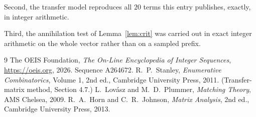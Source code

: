 \documentclass[11pt,a4paper]{article}
\theoremstyle{plain}
\theoremstyle{definition}
\begin{document}
Second, the transfer model reproduces all $20$ terms this entry publishes, exactly, in
integer arithmetic.

Third, the annihilation test of Lemma~\ref{lem:crit} was carried out in exact integer
arithmetic on the whole vector rather than on a sampled prefix.

\begin{thebibliography}{9}
 The OEIS Foundation, \emph{The On-Line Encyclopedia of Integer
Sequences}, \url{https://oeis.org}, 2026. Sequence A264672.
 R.~P.~Stanley, \emph{Enumerative Combinatorics}, Volume 1, 2nd ed.,
Cambridge University Press, 2011. (Transfer-matrix method, Section 4.7.)
 L.~Lov\'asz and M.~D.~Plummer, \emph{Matching Theory}, AMS Chelsea, 2009.
 R.~A.~Horn and C.~R.~Johnson, \emph{Matrix Analysis}, 2nd ed., Cambridge
University Press, 2013.
\end{thebibliography}
\end{document}
